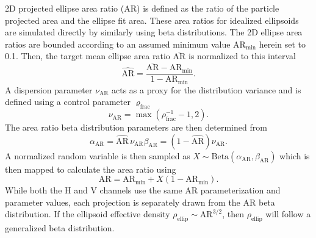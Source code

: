 \documentclass[amt, manuscript]{copernicus}
\begin{document}

2D projected ellipse area ratio ($\mathrm{AR}$) is defined as the ratio of the particle projected area and the ellipse fit area. These area ratios for idealized ellipsoids are simulated directly by similarly using beta distributions. The 2D ellipse area ratios are bounded according to an assumed minimum value $\mathrm{AR}_{\min}$ herein set to 0.1. Then, the target mean ellipse area ratio $\overline{\mathrm{AR}}$ is normalized to this interval 
\begin{equation}\label{eq:AR_mean}
\widehat{\mathrm{AR}} = \frac{\overline{\mathrm{AR}}-\mathrm{AR}_{\min}}{1-\mathrm{AR}_{\min}}.
\end{equation}
A dispersion parameter $\nu_{\mathrm{AR}}$ acts as a proxy for the distribution variance and is defined using a control parameter $\varrho_{\mathrm{frac}}$
\begin{equation}\label{eq:nu_AR}
\nu_{\mathrm{AR}} = \max\left(\rho_{\mathrm{frac}}^{-1} - 1, 2\right).
\end{equation}
The area ratio beta distribution parameters are then determined from
\begin{subequations}\label{eq:beta_AR}
\begin{equation}
\alpha_{\mathrm{AR}} = \widehat{\mathrm{AR}}\, \nu_{\mathrm{AR}}
\end{equation}
\begin{equation}
\beta_{\mathrm{AR}} = \left(1-\widehat{\mathrm{AR}}\right) \nu_{\mathrm{AR}}.
\end{equation}
\end{subequations}
A normalized random variable is then sampled as $X \sim \mathrm{Beta}\left(\alpha_{\mathrm{AR}},\beta_{\mathrm{AR}} \right)$ which is then mapped to calculate the area ratio using
\begin{equation}\label{eq:AreaRatio}
\mathrm{AR} = \mathrm{AR}_{\min} + X\left( 1 - \mathrm{AR}_{\min} \right).
\end{equation}
While both the H and V channels use the same AR parameterization and parameter values, each projection is separately drawn from the AR beta distribution. If the ellipsoid effective density $\rho_{\mathrm{ellip}} \sim \mathrm{AR}^{3/2}$, then $\rho_{\mathrm{ellip}}$ will follow a generalized beta distribution. 
\end{document}
